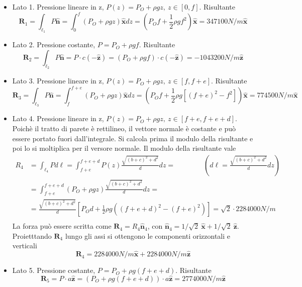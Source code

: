 \begin{itemize}
 \item Lato 1. Pressione lineare in z, $P(z) = P_O + \rho g z , \ z \in [0,f] $. Risultante
   \begin{equation}
   \bm{R}_1 = \int_{\ell_1} P \bm{\hat{n}} = \int_{0}^{f} (P_O + \rho g z) \bm{\hat{x}} dz = 
     \displaystyle\left(P_O  f + \frac{1}{2} \rho g f^2 \right) \bm{\hat{x}} = 347100 N/m \bm{\hat{x}}
   \end{equation}
 \item Lato 2. Pressione costante, $P = P_O + \rho g f$. Risultante 
   \begin{equation}
     \bm{R}_2 = \int_{\ell_2} P \bm{\hat{n}} = P\cdot c (-\bm{\hat{z}})=(P_O + \rho g f)\cdot c(-\bm{\hat{z}}) = - 1043200 N/m \bm{\hat{z}}
   \end{equation}
 \item Lato 3. Pressione lineare in z, $P(z) = P_O + \rho g z , \  z \in [f,f+e]$. Risultante
   \begin{equation}
     \bm{R}_3 = \int_{\ell_3} P \bm{\hat{n}} = \int_{f}^{f+e} (P_O + \rho g z) \bm{\hat{x}} dz = 
     \displaystyle\left(P_O  f + \frac{1}{2} \rho g \left[(f+e)^2 - f^2\right]\right) \bm{\hat{x}} = 774500 N/m \bm{\hat{x}}
   \end{equation}
 \item Lato 4. Pressione lineare in z, $P(z)  = P_O + \rho g z , \ z \in [f+e,f+e+d]$. Poichè il tratto di parete è rettilineo, il vettore normale è costante e può essere portato fuori dall'integrale. Si calcola prima il modulo della risultante e poi lo si moltiplica per il versore normale. Il modulo della risultante vale
   \begin{equation}
   \begin{aligned}
      {R}_4 & = \int_{\ell_4} P d\ell = \int_{f+e}^{f+e+d} P(z) \frac{\sqrt{(b+c)^2+d^2}}{d} dz = \qquad \qquad \text{$\displaystyle\left(d\ell = \frac{\sqrt{(b+c)^2+d^2}}{d} dz \right)$} \\
     & = \int_{f+e}^{f+e+d} (P_O + \rho g z) \frac{\sqrt{(b+c)^2+d^2}}{d} dz = \\
     & = \frac{\sqrt{(b+c)^2+d^2}}{d}\left[ P_O d + \frac{1}{2} \rho g \left((f+e+d)^2-(f+e)^2 \right)  \right] = 
     \sqrt{2} \cdot 2284000 N/m \\
   \end{aligned}
   \end{equation}
   La forza può essere scritta come $\bm{R}_4 = R_4 \bm{\hat{n}}_4$, con
   $\bm{\hat{n}}_4 = 1/\sqrt{2} \ \hat{\bm{x}} + 1/\sqrt{2} \ \hat{\bm{z}}$. Proietttando $\bm{R}_4$ lungo gli assi si ottengono le componenti orizzontali
   e verticali
   \begin{equation}
     \bm{R}_4 = 2284000 N/m \bm{\hat{x}} + 2284000 N/m \bm{\hat{z}}
   \end{equation}
 \item Lato 5. Pressione costante, $P = P_O + \rho g (f+e+d)$. Risultante 
   \begin{equation}
     \bm{R}_5 = P\cdot a \bm{\hat{z}} =(P_O + \rho g (f+e+d))\cdot a \bm{\hat{z}} =  2774000 N/m \bm{\hat{z}}
   \end{equation}
 
\end{itemize}

